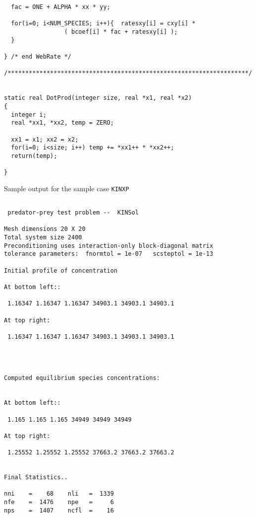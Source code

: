 \begin{verbatim}
  fac = ONE + ALPHA * xx * yy;

  for(i=0; i<NUM_SPECIES; i++){  ratesxy[i] = cxy[i] *
				 ( bcoef[i] * fac + ratesxy[i] );
  }

} /* end WebRate */

/********************************************************************/


static real DotProd(integer size, real *x1, real *x2)
{
  integer i;
  real *xx1, *xx2, temp = ZERO;
  
  xx1 = x1; xx2 = x2;
  for(i=0; i<size; i++) temp += *xx1++ * *xx2++;
  return(temp);

}
\end{verbatim}
\newpage
\normalsize

Sample output for the sample case {\tt KINXP}

\small
\begin{verbatim}

 predator-prey test problem --  KINSol

Mesh dimensions 20 X 20
Total system size 2400
Preconditioning uses interaction-only block-diagonal matrix
tolerance parameters:  fnormtol = 1e-07   scsteptol = 1e-13

Initial profile of concentration

At bottom left::

 1.16347 1.16347 1.16347 34903.1 34903.1 34903.1

At top right:

 1.16347 1.16347 1.16347 34903.1 34903.1 34903.1




Computed equilibrium species concentrations:


At bottom left::

 1.165 1.165 1.165 34949 34949 34949

At top right:

 1.25552 1.25552 1.25552 37663.2 37663.2 37663.2


Final Statistics.. 

nni    =    68    nli   =  1339
nfe    =  1476    npe   =     6
nps    =  1407    ncfl  =    16



\end{verbatim}
\normalsize




